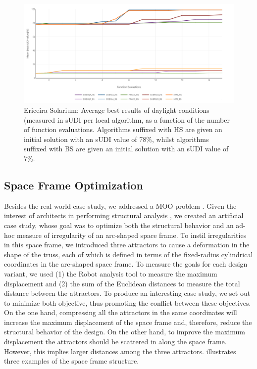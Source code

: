 \begin{figure}[htbp]
	\centering
	\includegraphics[width=\textwidth]{Images/Evaluation/Ericeira_results_ph2.PNG}
	\caption[Ericeira Solarium: Average best results of daylight conditions (measured in \ac{sUDI}) per local algorithm]{Ericeira Solarium: Average best results of daylight conditions (measured in \ac{sUDI} per local algorithm, as a function of the number of function evaluations. Algorithms suffixed with HS are given an initial solution with an sUDI value of 78\%, whilst algorithms suffixed with BS are given an initial solution with an sUDI value of 7\%.}
	\label{fig:phase2results}
\end{figure}


\subsection{Space Frame Optimization}

Besides the real-world case study, we addressed a \ac{MOO} problem \cite{Belem2019MOO}. Given the interest of architects in performing structural analysis \cite{Cichocka2017SURVEY}, we created an artificial case study, whose goal was to optimize both the structural behavior and an ad-hoc measure of irregularity of an arc-shaped space frame. To instil irregularities in this space frame, we introduced three attractors to cause a deformation in the shape of the truss, each of which is defined in terms of the fixed-radius cylindrical coordinates in the arc-shaped space frame. To measure the goals for each design variant, we used (1) the Robot analysis tool to measure the maximum displacement and (2) the sum of the Euclidean distances to measure the total distance between the attractors. To produce an interesting case study, we set out to minimize both objective, thus promoting the conflict between these objectives. On the one hand, compressing all the attractors in the same coordinates will increase the maximum displacement of the space frame and, therefore, reduce the structural behavior of the design. On the other hand,  to improve the maximum displacement the attractors should be scattered in along the space frame. However, this implies larger distances among the three attractors.  illustrates three examples of the space frame structure. 

